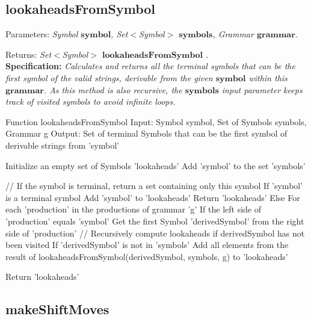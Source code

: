 \vspace{30pt}

\subsection{lookaheadsFromSymbol}

Parameters: \textit{Symbol \(\boldsymbol{symbol}\), Set\(<\)Symbol\(>\) \(\boldsymbol{symbols}\), Grammar \(\boldsymbol{grammar}\).}

Returns: \textit{Set\(<\)Symbol\(>\) \(\boldsymbol{lookaheadsFromSymbol}\) .}\\

\textbf{Specification:} \textit{Calculates and returns all the terminal symbols that can be the first symbol of the valid strings, derivable from the given \(\boldsymbol{symbol}\) within this \(\boldsymbol{grammar}\). As this method is also recursive, the \(\boldsymbol{symbols}\) input parameter keeps track of visited symbols to avoid infinite loops.}\\

\begin{codeblock}
    Function lookaheadsFromSymbol
    Input: Symbol symbol, Set of Symbols symbols, Grammar g
    Output: Set of terminal Symbols that can be the first symbol of derivable strings from 'symbol'

    Initialize an empty set of Symbols 'lookaheads'
    Add 'symbol' to the set 'symbols'

    // If the symbol is terminal, return a set containing only this symbol
    If 'symbol' is a terminal symbol
    Add 'symbol' to 'lookaheads'
    Return 'lookaheads'
    Else
    For each 'production' in the productions of grammar 'g'
    If the left side of 'production' equals 'symbol'
    Get the first Symbol 'derivedSymbol' from the right side of 'production'
    // Recursively compute lookaheads if derivedSymbol has not been visited
    If 'derivedSymbol' is not in 'symbols'
    Add all elements from the result of lookaheadsFromSymbol(derivedSymbol, symbols, g) to 'lookaheads'

    Return 'lookaheads'
\end{codeblock}

\vspace{30pt}

\subsection{makeShiftMoves}

